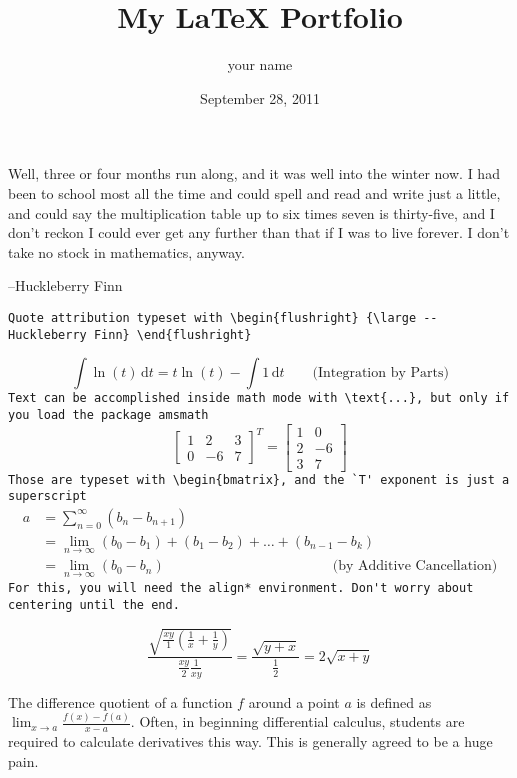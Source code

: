 \documentclass{article}
\title{My \LaTeX{} Portfolio}
\author{your name}
\date{September 28, 2011}
\begin{document}
\maketitle
\thispagestyle{empty}
Well, three or four months run along, and it was well into the winter now. I had been to school most all the time and could spell and read and write just a little, and could say the multiplication table up to six times seven is thirty-five, and I don't reckon I could ever get any further than that if I was to live forever.  I don't take no stock in mathematics, anyway. \begin{flushright} {\large  --Huckleberry Finn} \end{flushright}
\verb|Quote attribution typeset with \begin{flushright} {\large --Huckleberry Finn} \end{flushright}|

\[
\int \ln(t) \, \mathrm{d}t= t \ln(t) - \int 1\, \mathrm{d}t 	\qquad \text{(Integration by Parts)}
\]
\verb|Text can be accomplished inside math mode with \text{...}, but only if you load the package amsmath|
\[
\begin{bmatrix}
	1 & 2 & 3 \\
	0 & -6 & 7
\end{bmatrix}^T =
\begin{bmatrix}
	1 & 0 \\
	2 & -6 \\
	3 & 7
\end{bmatrix}
\]
\verb|Those are typeset with \begin{bmatrix}, and the `T' exponent is just a superscript|
\begin{align*}
a&=\sum_{n=0}^\infty (b_n-b_{n+1})\\
&=\lim_{n \to \infty} (b_0 - b_1) + (b_1 -b_2) + \ldots + (b_{n-1} - b_k)\\
&=\lim_{n \to \infty} (b_0-b_n) \hspace{2in} \text{(by Additive Cancellation)}
\end{align*}
\verb|For this, you will need the align* environment. Don't worry about centering until the end.|


\[
\frac{\sqrt{\frac{xy}{1}(\frac{1}{x}+\frac{1}{y})}}{\frac{xy}{2}\frac{1}{xy}}=\frac{\sqrt{y+x}}{\frac{1}{2}}=2\sqrt{x+y}
\]
\vspace{3ex}


The difference quotient of a function $f$ around a point $a$ is defined as \( \displaystyle\lim_{x \to a} \frac{f(x)-f(a)}{x-a} \). Often, in beginning differential calculus, students are required to calculate derivatives this way. This is generally agreed to be a huge pain.
\vspace{2ex}
\end{document}
